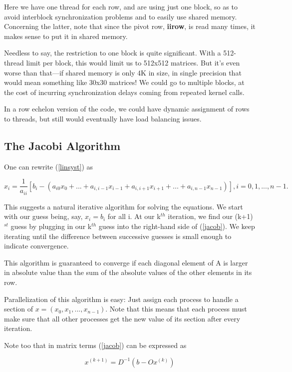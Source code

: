 Here we have one thread for each row, and are using just one block, so
as to avoid interblock synchronization problems and to easily use shared
memory.  Concerning the latter, note that since the pivot row, {\bf
iirow}, is read many times, it makes sense to put it in shared memory.

Needless to say, the restriction to one block is quite significant.
With a 512-thread limit per block, this would limit us to 512x512
matrices.  But it's even worse than that---if shared memory is only 4K
in size, in single precision that would mean something like 30x30
matrices!  We could go to multiple blocks, at the cost of incurring
synchronization delays coming from repeated kernel calls.

In a row echelon version of the code, we could have dynamic assignment
of rows to threads, but still would eventually have load balancing
issues.

\subsection{The Jacobi Algorithm}

One can rewrite (\ref{linsyst}) as

\begin{equation}
\label{jacob}
x_i = \frac{1}{a_{ii}}
[b_i -
(a_{i0} x_0 + ...+ a_{i,i-1} x_{i-1} +
a_{i,i+1} x_{i+1} + ...
+ a_{i,n-1} x_{n-1})] , i = 0,1,...,n-1.
\end{equation}

This suggests a natural iterative algorithm for solving the equations.
We start with our guess being, say, $x_i = b_i$ for all i.  At our
k$^{th}$ iteration, we find our (k+1)$^{st}$ guess by plugging in our
k$^{th}$ guess into the right-hand side of (\ref{jacob}).  We keep
iterating until the difference between successive guesses is small
enough to indicate convergence.

This algorithm is guaranteed to converge if each diagonal element of A
is larger in absolute value than the sum of the absolute values of the
other elements in its row.

Parallelization of this algorithm is easy:  Just assign each process to
handle a section of $x = (x_0,x_1,...,x_{n-1})$.  Note that this means that
each process must make sure that all other processes get the new value
of its section after every iteration.

Note too that in matrix terms (\ref{jacob}) can be expressed as 

\begin{equation}
\label{jacmat}
x^{(k+1)} = D^{-1} (b - O x^{(k)}) 
\end{equation}

